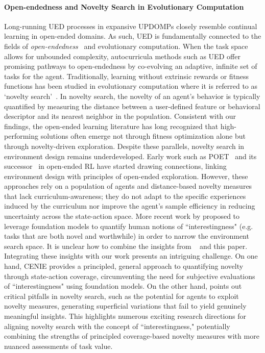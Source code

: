 \paragraph{Open-endedness and Novelty Search in Evolutionary Computation} Long-running UED processes in expansive UPDOMPs closely resemble continual learning in open-ended domains. As such, UED is fundamentally connected to the fields of {\em open-endedness}~\cite{stanley2015} and evolutionary computation. When the task space allows for unbounded complexity, autocurricula methods such as UED offer promising pathways to open-endedness by co-evolving an adaptive, infinite set of tasks for the agent. Traditionally, learning without extrinsic rewards or fitness functions has been studied in evolutionary computation where it is referred to as ‘novelty search’~\cite{lehman2008,lehman2011}. In novelty search, the novelty of an agent’s behavior is typically quantified by measuring the distance between a user-defined feature or behavioral descriptor and its nearest neighbor in the population. Consistent with our findings, the open-ended learning literature has long recognized that high-performing solutions often emerge not through fitness optimization alone but through novelty-driven exploration. Despite these parallels, novelty search in environment design remains underdeveloped. Early work such as POET~\cite{wang2019poet} and its successor~\cite{wang2020enhanced} in open-ended RL have started drawing connections, linking environment design with principles of open-ended exploration. However, these approaches rely on a population of agents and distance-based novelty measures that lack curriculum-awareness; they do not adapt to the specific experiences induced by the curriculum nor improve the agent’s sample efficiency in reducing uncertainty across the state-action space. More recent work by \citet{zhang2024omni} proposed to leverage foundation models to quantify human notions of ``interestingness" (e.g. tasks that are both novel and worthwhile) in order to narrow the environment search space. It is unclear how to combine the insights from ~\citet{zhang2024omni} and this paper. Integrating these insights with our work presents an intriguing challenge. On one hand, CENIE provides a principled, general approach to quantifying novelty through state-action coverage, circumventing the need for subjective evaluations of ``interestingness" using foundation models. On the other hand, \citet{zhang2024omni} points out critical pitfalls in novelty search, such as the potential for agents to exploit novelty measures, generating superficial variations that fail to yield genuinely meaningful insights. This highlights numerous exciting research directions for aligning novelty search with the concept of ``interestingness," potentially combining the strengths of principled coverage-based novelty measures with more nuanced assessments of task value.


